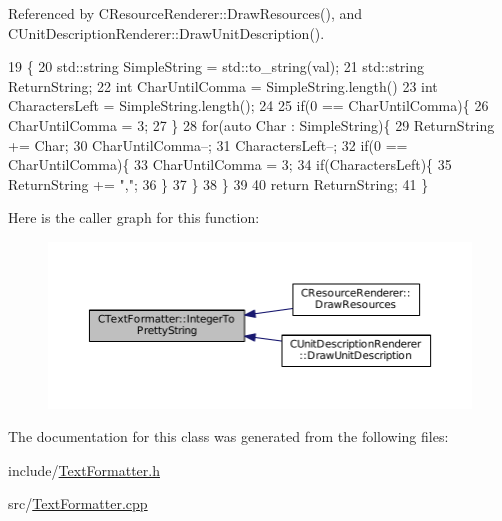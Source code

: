 Referenced by C\+Resource\+Renderer\+::\+Draw\+Resources(), and C\+Unit\+Description\+Renderer\+::\+Draw\+Unit\+Description().


\begin{DoxyCode}
19                                                       \{
20     std::string SimpleString = std::to\_string(val);
21     std::string ReturnString;
22     \textcolor{keywordtype}{int} CharUntilComma = SimpleString.length() %
23     \textcolor{keywordtype}{int} CharactersLeft = SimpleString.length();
24     
25     \textcolor{keywordflow}{if}(0 == CharUntilComma)\{
26         CharUntilComma = 3;    
27     \}
28     \textcolor{keywordflow}{for}(\textcolor{keyword}{auto} Char : SimpleString)\{
29         ReturnString += Char; 
30         CharUntilComma--;
31         CharactersLeft--;
32         \textcolor{keywordflow}{if}(0 == CharUntilComma)\{
33             CharUntilComma = 3;
34             \textcolor{keywordflow}{if}(CharactersLeft)\{
35                 ReturnString += \textcolor{stringliteral}{","};
36             \}
37         \}
38     \}
39     
40     \textcolor{keywordflow}{return} ReturnString;
41 \}
\end{DoxyCode}
Here is the caller graph for this function\+:\nopagebreak
\begin{figure}[H]
\begin{center}
\leavevmode
\includegraphics[width=350pt]{classCTextFormatter_a99cc7219fb635bff88c31f0b906f5db0_icgraph}
\end{center}
\end{figure}


The documentation for this class was generated from the following files\+:\begin{DoxyCompactItemize}
\item 
include/\hyperlink{TextFormatter_8h}{Text\+Formatter.\+h}\item 
src/\hyperlink{TextFormatter_8cpp}{Text\+Formatter.\+cpp}\end{DoxyCompactItemize}
